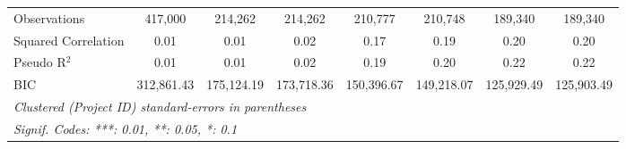 \documentclass[
]{article}
\begin{document}
\begin{table}[htbp]
\begin{tabular}{lccccccc}
      Observations                        & 417,000        & 214,262        & 214,262       & 210,777       & 210,748       & 189,340       & 189,340\\  
      Squared Correlation                 & 0.01           & 0.01           & 0.02          & 0.17          & 0.19          & 0.20          & 0.20\\  
      Pseudo R$^2$                        & 0.01           & 0.01           & 0.02          & 0.19          & 0.20          & 0.22          & 0.22\\  
      BIC                                 & 312,861.43     & 175,124.19     & 173,718.36    & 150,396.67    & 149,218.07    & 125,929.49    & 125,903.49\\  
      \midrule
      \multicolumn{8}{l}{\emph{Clustered (Project ID) standard-errors in parentheses}}\\
      \multicolumn{8}{l}{\emph{Signif. Codes: ***: 0.01, **: 0.05, *: 0.1}}\\
   \end{tabular}
\end{table}
\begingroup
\centering
\small
\end{document}
